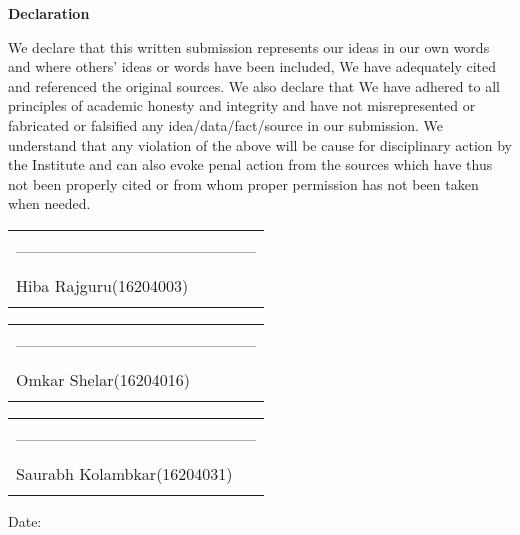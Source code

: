 \newpage
\thispagestyle{empty}
\vspace*{0.2cm}
\vspace{1cm}
\begin{center}
 \large\textbf{Declaration}
\end{center}
\vspace{1cm}
We declare that this written submission represents our ideas in our own words 
and where others' ideas or words have been included, We have adequately cited and referenced the original sources. We also declare that We have adhered to all 
principles of academic honesty and integrity and have not misrepresented 
or fabricated or falsified any idea/data/fact/source in our submission. We understand that any violation of the above will be cause for disciplinary action by the Institute and can also evoke penal action from the sources which have thus not been properly cited or from whom proper permission has not been taken when needed. 

\hfill
\begin{tabular}{@{}l@{}}
\vspace{20 mm}\\
---------------------------------------------\\
\vspace{0.5 mm}\\
\hspace{10.5 mm} Hiba Rajguru(16204003)\\
\vspace{5 mm}
\end{tabular}

\hfill
\begin{tabular}{@{}l@{}}
\vspace{10 mm}\\
---------------------------------------------\\
\vspace{0.5 mm}\\
\hspace{10.5 mm} Omkar Shelar(16204016)\\
\vspace{5 mm}
\end{tabular}

\hfill
\begin{tabular}{@{}l@{}}
\vspace{10 mm}\\
---------------------------------------------\\
\vspace{0.5 mm}\\
\hspace{5 mm} Saurabh Kolambkar(16204031)\\
\vspace{5 mm}
\end{tabular}




Date:

\clearpage